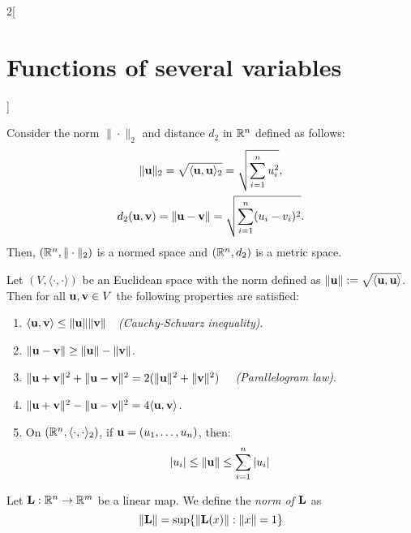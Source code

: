 \documentclass[../../../main.tex]{subfiles}
\begin{document}
\begin{multicols}{2}[\section{Functions of several variables}]
\begin{prop}
    \end{prop}
    \begin{corollary}
        Consider the norm $\|\cdot\|_2$ and distance $d_2$ in $\mathbb{R}^n$ defined as follows:
        \begin{gather*}
            \|\boldsymbol{\mathrm{u}}\|_2=\sqrt{\langle \boldsymbol{\mathrm{u}},\boldsymbol{\mathrm{u}}\rangle_2}=\sqrt{\sum_{i=1}^nu_i^2},\\
            d_2(\boldsymbol{\mathrm{u}},\boldsymbol{\mathrm{v}})=\|\boldsymbol{\mathrm{u}}-\boldsymbol{\mathrm{v}}\|=\sqrt{\sum_{i=1}^n(u_i-v_i)^2}.
        \end{gather*}
        Then, $(\mathbb{R}^n,\|\cdot\|_2)$ is a normed space and $(\mathbb{R}^n,d_2)$ is a metric space.
    \end{corollary}
    \begin{prop}
        Let $(V,\langle\cdot,\cdot\rangle)$ be an Euclidean space with the norm defined as $\|\boldsymbol{\mathrm{u}}\|:=\sqrt{\langle \boldsymbol{\mathrm{u}},\boldsymbol{\mathrm{u}}\rangle}$. Then for all $\boldsymbol{\mathrm{u}},\boldsymbol{\mathrm{v}}\in V$ the following properties are satisfied:
        \begin{enumerate}
            \item $\langle \boldsymbol{\mathrm{u}},\boldsymbol{\mathrm{v}}\rangle\leq\|\boldsymbol{\mathrm{u}}\|\|\boldsymbol{\mathrm{v}}\|\quad$\textit{(Cauchy-Schwarz inequality)}.
            \item $\|\boldsymbol{\mathrm{u}}-\boldsymbol{\mathrm{v}}\|\geq\|\boldsymbol{\mathrm{u}}\|-\|\boldsymbol{\mathrm{v}}\|$.
            \item $\|\boldsymbol{\mathrm{u}}+\boldsymbol{\mathrm{v}}\|^2+\|\boldsymbol{\mathrm{u}}-\boldsymbol{\mathrm{v}}\|^2=2(\|\boldsymbol{\mathrm{u}}\|^2+\|\boldsymbol{\mathrm{v}}\|^2)\quad$ \textit{(Parallelogram law)}.
            \item $\|\boldsymbol{\mathrm{u}}+\boldsymbol{\mathrm{v}}\|^2-\|\boldsymbol{\mathrm{u}}-\boldsymbol{\mathrm{v}}\|^2=4\langle \boldsymbol{\mathrm{u}},\boldsymbol{\mathrm{v}}\rangle$.
            \item On $(\mathbb{R}^n,\langle\cdot,\cdot\rangle_2)$, if $\boldsymbol{\mathrm{u}}=(u_1,\ldots,u_n)$, then: $$|u_i|\leq\|\boldsymbol{\mathrm{u}}\|\leq\sum_{i=1}^n|u_i|$$
        \end{enumerate}
    \end{prop}
    \begin{definition}
        Let $\boldsymbol{\mathrm{L}}:\mathbb{R}^n\rightarrow\mathbb{R}^m$ be a linear map. We define the \textit{norm of $\boldsymbol{\mathrm{L}}$} as $$\|\boldsymbol{\mathrm{L}}\|=\sup\{\|\boldsymbol{\mathrm{L}}(x)\|:\|x\|=1\}$$
    \end{definition}

\end{multicols}
\end{document}
